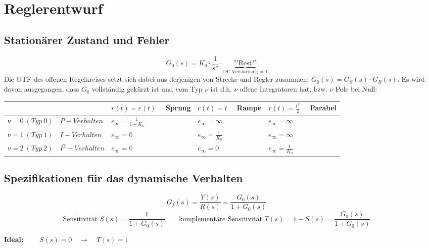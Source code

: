 \section{Reglerentwurf }
\subsection{Stationärer Zustand und Fehler }
\[ G_0(s) = K_0 \cdot \frac{1}{s^{\nu}} \cdot \underbrace{\text{"'Rest"'}}_\textrm{DC-Verstärkung = 1} \]
Die UTF des offenen Regelkreises setzt sich dabei aus derjenigen von Strecke
und Regler zusammen: $G_0(s) = G_S(s)\cdot G_R(s)$. Es wird davon ausgegangen, dass $G_0$
vollständig gekürzt ist und vom Typ $\nu$ ist d.h. $\nu$ offene Integratoren hat, bzw. $\nu$ Pole
bei Null:
\begin{table}[h!]
	\begin{tabularx}{\textwidth}{|l||X|X|X|}
	\hline
		& $r(t)=\varepsilon(t) \quad $ Sprung & $r(t)=t \quad$ Rampe & $r(t)=\frac{t^2}{2} \quad$ Parabel \\ 
		\hline\hline
		$\nu =0 \ (Typ \ 0) \quad P-Verhalten$ & $e_\infty=\frac{1}{1+K_0}$ & $e_\infty=\infty$ & $e_\infty=\infty$ \\ \hline
		$\nu =1 \ (Typ \ 1) \quad  I-Verhalten$ & $e_\infty=0$ & $e_\infty=\frac{1}{K_0}$ & $e_\infty=\infty$ \\ \hline
		$\nu =2 \ (Typ \ 2) \quad  I^2-Verhalten$ & $e_\infty=0$ & $e_\infty=0$ & $e_\infty=\frac{1}{K_0}$ \\ \hline
	\end{tabularx}
\end{table}
\subsection{Spezifikationen für das dynamische Verhalten }
\begin{equation*} 
	G_f(s)=\frac{Y(s)}{R(s)}=\frac{G_0(s)}{1+G_0(s)}
\end{equation*}
\begin{equation*}
	 \text{Sensitivität } S(s)=\frac{1}{1+G_0(s)} \qquad \text{komplementäre Sensitivität } T(s)=1-S(s)=\frac{G_0(s)}{1+G_0(s)}
\end{equation*}

\begin{center}
	\textbf{Ideal:} $\qquad S(s) = 0 \quad \rightarrow \quad T(s) =1 $
\end{center}

